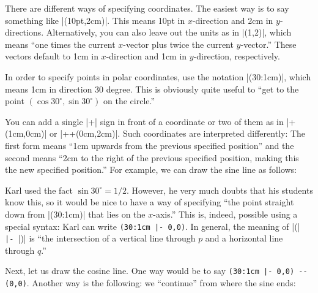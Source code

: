There are different ways of specifying coordinates. The easiest way is
to say something like |(10pt,2cm)|. This means 10pt in $x$-direction
and 2cm in $y$-directions. Alternatively, you can also leave out the
units as in |(1,2)|, which means ``one times the current $x$-vector
plus twice the current $y$-vector.'' These vectors default to 1cm in
$x$-direction and 1cm in $y$-direction, respectively.

In order to specify points in polar coordinates, use the notation
|(30:1cm)|, which means 1cm in direction 30 degree. This is obviously
quite useful to ``get to the point $(\cos 30^\circ,\sin 30^\circ)$ on
the circle.'' 

You can add a single |+| sign in front of a coordinate or two of
them as in |+(1cm,0cm)| or |++(0cm,2cm)|. Such coordinates are interpreted
differently: The first form means ``1cm upwards from the previous
specified position'' and the second means ``2cm to the right of the
previous specified position, making this the new specified position.''
For example, we can draw the sine line as follows:

\begin{codeexample}[]
\end{codeexample}

Karl used the fact $\sin 30^\circ = 1/2$. However, he very much
doubts that his students know this, so it would be nice to have a way
of specifying ``the point straight down from |(30:1cm)| that lies on
the $x$-axis.'' This is, indeed, possible using a special syntax: Karl
can write \verb!(30:1cm |- 0,0)!. In general, the meaning of
|(|\verb! |- !|)| is ``the intersection of a vertical
line through $p$ and a horizontal line through $q$.''

Next, let us draw the cosine line. One way would be to say
\verb!(30:1cm |- 0,0) -- (0,0)!. Another way is the following: we
``continue'' from where the sine ends: 

\begin{codeexample}[]
\end{codeexample}

